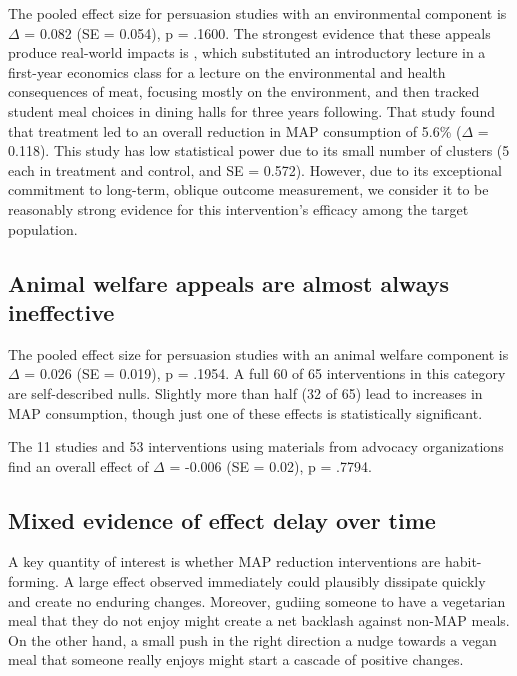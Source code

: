 \documentclass[sn-nature,referee,pdflatex]{sn-jnl}
\begin{document}
The pooled effect size for persuasion studies with an environmental
component is \(\Delta\) = 0.082 (SE = 0.054), p = .1600. The strongest
evidence that these appeals produce real-world impacts is
\citep{jalil2023}, which substituted an introductory lecture in a
first-year economics class for a lecture on the environmental and health
consequences of meat, focusing mostly on the environment, and then
tracked student meal choices in dining halls for three years following.
That study found that treatment led to an overall reduction in MAP
consumption of 5.6\% (\(\Delta\) = 0.118). This study has low
statistical power due to its small number of clusters (5 each in
treatment and control, and SE = 0.572). However, due to its exceptional
commitment to long-term, oblique outcome measurement, we consider it to
be reasonably strong evidence for this intervention's efficacy among the
target population.

\subsection{Animal welfare appeals are almost always
ineffective}\label{sec2.9}

The pooled effect size for persuasion studies with an animal welfare
component is \(\Delta\) = 0.026 (SE = 0.019), p = .1954. A full 60 of 65
interventions in this category are self-described nulls. Slightly more
than half (32 of 65) lead to increases in MAP consumption, though just
one of these effects is statistically significant.

The 11 studies and 53 interventions using materials from advocacy
organizations find an overall effect of \(\Delta\) = -0.006 (SE = 0.02),
p = .7794.

\subsection{Mixed evidence of effect delay over time}\label{sec2.10}

A key quantity of interest is whether MAP reduction interventions are
habit-forming. A large effect observed immediately \citep{hansen2021}
could plausibly dissipate quickly and create no enduring changes.
Moreover, gudiing someone to have a vegetarian meal that they do not
enjoy might create a net backlash against non-MAP meals. On the other
hand, a small push in the right direction \textemdash a nudge towards a
vegan meal that someone really enjoys \textemdash might start a cascade
of positive changes.
\end{document}
